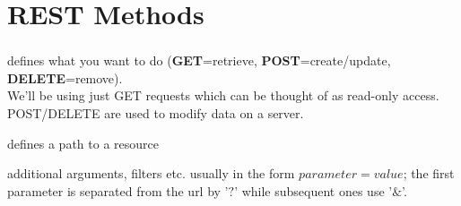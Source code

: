 \documentclass[a4paper,10pt,xcolor=pdftex,dvipsnames,table]{beamer}
\begin{document}
\section{REST Methods}
\begin{frame}[t]\frametitle{\insertsection{}}
\note{}
\begin{block}{}
\begin{description}{}
\item<+->[\alert<2>{Method}] defines what you want to do (\textbf{GET}=retrieve, \textbf{POST}=create/update, \textbf{DELETE}=remove).\\
    {\scriptsize We'll be using just GET requests which can be thought of as read-only access. POST/DELETE are used to modify data on a server.}
    \item<+->[\alert<3>{URL}] defines a path to a resource
    \item<+->[\alert<4>{Parameters}] additional arguments, filters etc. usually in the form $parameter=value$; the first parameter is separated from the url by '$?$' while subsequent ones use '$\&$'.
    \end{description}
    \end{block}
\end{frame}
\end{document}
